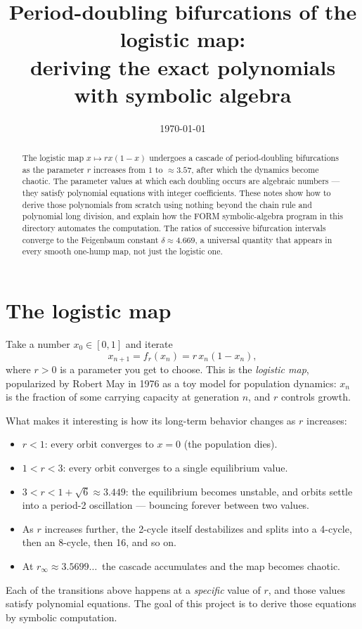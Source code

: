 \documentclass[11pt]{article}
\title{Period-doubling bifurcations of the logistic map:\\
\large deriving the exact polynomials with symbolic algebra}
\author{}
\date{\today}
\begin{document}
\maketitle

\begin{abstract}
The logistic map $x\mapsto rx(1-x)$ undergoes a cascade of period-doubling
bifurcations as the parameter $r$ increases from $1$ to $\approx 3.57$, after
which the dynamics become chaotic.  The parameter values at which each doubling
occurs are algebraic numbers --- they satisfy polynomial equations with integer
coefficients.  These notes show how to derive those polynomials from scratch
using nothing beyond the chain rule and polynomial long division, and explain
how the FORM symbolic-algebra program in this directory automates the
computation.  The ratios of successive bifurcation intervals converge to the
Feigenbaum constant $\delta\approx 4.669$, a universal quantity that appears in
every smooth one-hump map, not just the logistic one.
\end{abstract}

\tableofcontents

\section{The logistic map}
\label{sec:logistic}

Take a number $x_0\in[0,1]$ and iterate
\begin{equation}
\label{eq:logistic}
x_{n+1} = f_r(x_n) = r\,x_n(1-x_n),
\end{equation}
where $r>0$ is a parameter you get to choose.  This is the \emph{logistic map},
popularized by Robert May in 1976 as a toy model for population dynamics: $x_n$
is the fraction of some carrying capacity at generation $n$, and $r$ controls
growth.

What makes it interesting is how its long-term behavior changes as $r$
increases:
\begin{itemize}
\item $r<1$: every orbit converges to $x=0$ (the population dies).
\item $1<r<3$: every orbit converges to a single equilibrium value.
\item $3<r<1+\sqrt{6}\approx 3.449$: the equilibrium becomes unstable, and
      orbits settle into a period-2 oscillation --- bouncing forever between
      two values.
\item As $r$ increases further, the 2-cycle itself destabilizes and splits into
      a 4-cycle, then an 8-cycle, then 16, and so on.
\item At $r_\infty\approx 3.5699\ldots$\, the cascade accumulates and the map
      becomes chaotic.
\end{itemize}
Each of the transitions above happens at a \emph{specific} value of $r$, and
those values satisfy polynomial equations.  The goal of this project is to
derive those equations by symbolic computation.
\end{document}

